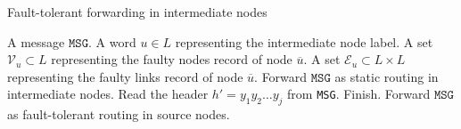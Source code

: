 \begin{algorithm}[htbp]
\caption{Fault-tolerant forwarding in intermediate nodes}
\label{al:fwd_int_ft}
\begin{algorithmic}[1]
	\REQUIRE A message $\texttt{MSG}$.
    \REQUIRE A word $u\in L$ representing the intermediate node label.
    \REQUIRE A set $\mathcal{V}_u \subset L$ representing the faulty nodes record of node $\overline{u}$.
    \REQUIRE A set $\mathcal{E}_u \subset L\times L$ representing the faulty links record of node $\overline{u}$.
    \STATE Forward $\texttt{MSG}$ as static routing in intermediate nodes.  
    \ELSE
    \STATE Read the header $h'=y_1y_2\ldots y_j$ from \texttt{MSG}.
    \STATE Finish.
    \ELSE
    \STATE Forward $\texttt{MSG}$ as fault-tolerant routing in source nodes. 
    \ENDIF
    
    \ENDIF   
\end{algorithmic}
\end{algorithm} 